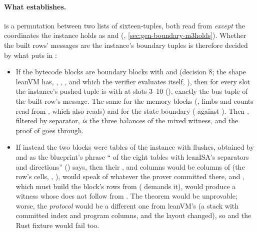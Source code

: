 \paragraph{What \texorpdfstring{\protect{}}{M3Holds} establishes.}
 is a permutation between two lists of sixteen-tuples, both read from 
\emph{except} the coordinates the instance holds as  and 
(, \cref{sec:gen-boundary-m3holds}). Whether the built rows' messages are the
instance's boundary tuples is therefore decided by what  puts in
:
\begin{itemize}
\item If the bytecode blocks are boundary blocks with
   and 
  (decision 8; the shape leanVM has, , ,
  , and which the verifier evaluates itself, ), then
  for every slot  the instance's pushed tuple is 
  with  at slots 3--10 
  (), exactly the bus tuple of the built row's message. The same for the
  memory blocks (,  limbs and counts read from ,
  which  also reads) and for the state boundary ( against
  ). Then , filtered by separator, \emph{is} the three
  balances of the mixed witness, and the proof of  goes through.
\item If instead the two blocks were tables of the instance with flushes, obtained by
   and  as the blueprint's phrase
  \enquote{ of the eight tables with leanISA's separators and directions}
  () says, then their ,  and  columns would be
  columns of  (the row's cells, , ),
   would speak of whatever the prover committed there, and ,
  which must build the block's rows from  ( demands it), would
  produce a witness whose  does not follow from . The
  theorem  would be unprovable; worse, the \emph{protocol} would be a
  different one from leanVM's (a stack with committed index and program columns,  and the
  layout changed), so  and the Rust fixture would fail too.
\end{itemize}

